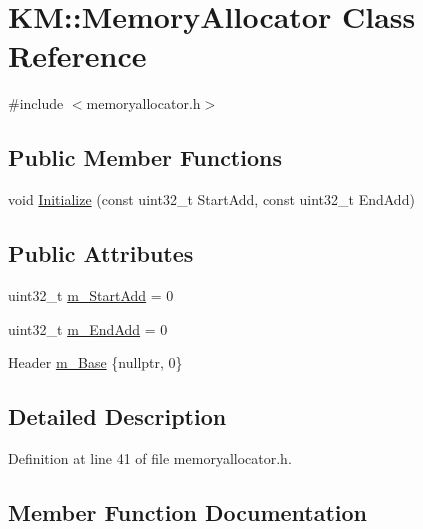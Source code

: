 \hypertarget{class_k_m_1_1_memory_allocator}{}\section{KM\+:\+:Memory\+Allocator Class Reference}
\label{class_k_m_1_1_memory_allocator}


{\ttfamily \#include $<$memoryallocator.\+h$>$}

\subsection*{Public Member Functions}
\begin{DoxyCompactItemize}
\item 
void \hyperlink{class_k_m_1_1_memory_allocator_acf0f1026d4b06044f1e4f21735ce6e5a}{Initialize} (const uint32\+\_\+t Start\+Add, const uint32\+\_\+t End\+Add)
\end{DoxyCompactItemize}
\subsection*{Public Attributes}
\begin{DoxyCompactItemize}
\item 
uint32\+\_\+t \hyperlink{class_k_m_1_1_memory_allocator_a7c20d888ecece0f856a4300f3134a5b8}{m\+\_\+\+Start\+Add} = 0
\item 
uint32\+\_\+t \hyperlink{class_k_m_1_1_memory_allocator_aebd2cb25d4536312f915b1d65d724934}{m\+\_\+\+End\+Add} = 0
\item 
Header \hyperlink{class_k_m_1_1_memory_allocator_aa69b432479e7d67731ff420ce9b904a4}{m\+\_\+\+Base} \{nullptr, 0\}
\end{DoxyCompactItemize}


\subsection{Detailed Description}


Definition at line 41 of file memoryallocator.\+h.



\subsection{Member Function Documentation}
\mbox{\label{class_k_m_1_1_memory_allocator_acf0f1026d4b06044f1e4f21735ce6e5a}} 
